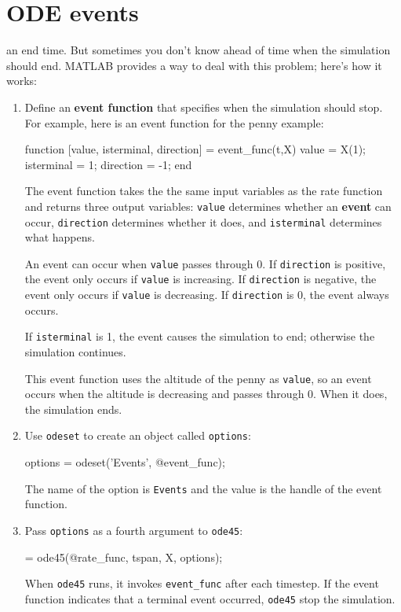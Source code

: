 \documentclass[
]{book}
\numberwithin{Answer}{chapter}
\numberwithin{Exercise}{chapter}
\begin{document}
\section{ODE events}
\label{sect:events}


an end time.  But sometimes you don't know ahead of time when the
simulation should end.  MATLAB provides a way to deal with this problem; here's how it works:

\begin{enumerate}

\item Define an {\bf event function} that specifies when the simulation should stop.  For example,  here is an event function for the penny example:

\begin{code}
function [value, isterminal, direction] = event_func(t,X)
    value = X(1);
    isterminal = 1;
    direction = -1;
end
\end{code}

The event function takes the the same input variables as the rate function and returns three output variables: {\tt value} determines whether an {\bf event} can occur, {\tt direction} determines whether it does, and {\tt isterminal} determines what happens.

An event can occur when {\tt value} passes through 0.
If {\tt direction} is positive, the event only occurs if {\tt value} is increasing.
If {\tt direction} is negative, the event only occurs if {\tt value} is decreasing.
If {\tt direction} is 0, the event always occurs.

If {\tt isterminal} is 1, the event causes the simulation to end; otherwise the simulation continues.

This event function uses the altitude of the penny as {\tt value}, so an event occurs when the altitude is decreasing and passes through 0.  When it does, the simulation ends.

\item Use {\tt odeset} to create an object called {\tt options}:

\begin{code}
options = odeset('Events', @event_func);
\end{code}
%
The name of the option is {\tt Events} and the value is the handle of the event function.  

\item Pass {\tt options} as a fourth argument to {\tt ode45}:

\begin{code}
[T, M] = ode45(@rate_func, tspan, X, options);
\end{code}

When {\tt ode45} runs, it invokes \verb"event_func" after each timestep.  If the event function indicates that a terminal event occurred, 
{\tt ode45} stop the simulation.

\end{enumerate}
\end{document}
